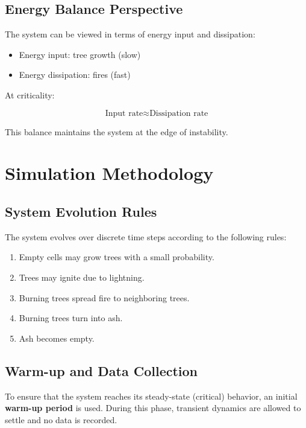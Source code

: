 \documentclass[12pt,a4paper]{article}
\begin{document}
\subsection{Energy Balance Perspective}

The system can be viewed in terms of energy input and dissipation:

\begin{itemize}
\item Energy input: tree growth (slow)
\item Energy dissipation: fires (fast)
\end{itemize}

At criticality:

\begin{equation}
\text{Input rate} \approx \text{Dissipation rate}
\end{equation}

This balance maintains the system at the edge of instability.

\section{Simulation Methodology }

\subsection{System Evolution Rules}

The system evolves over discrete time steps according to the following rules:

\begin{enumerate}
\item Empty cells may grow trees with a small probability.
\item Trees may ignite due to lightning.
\item Burning trees spread fire to neighboring trees.
\item Burning trees turn into ash.
\item Ash becomes empty.
\end{enumerate}

\subsection{Warm-up and Data Collection}

To ensure that the system reaches its steady-state (critical) behavior, an initial \textbf{warm-up period} is used. During this phase, transient dynamics are allowed to settle and no data is recorded.
\end{document}
